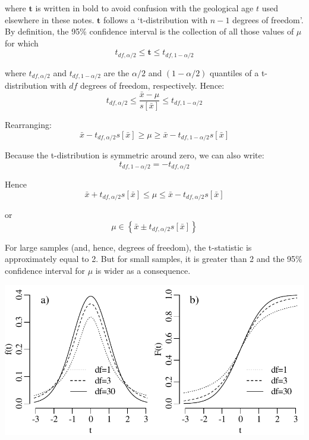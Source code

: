 \begin{refsection}
\noindent where $\mathbf{t}$ is written in bold to avoid confusion
with the geological age $t$ used elsewhere in these
notes. $\mathbf{t}$ follows a `t-distribution with $n-1$ degrees of
freedom'. By definition, the 95\% confidence interval is the
collection of all those values of $\mu$ for which
\[
t_{df,\alpha/2} \leq \mathbf{t} \leq t_{df,1-\alpha/2}
\]

\noindent where $t_{df,\alpha/2}$ and $t_{df,1-\alpha/2}$ are the
$\alpha/2$ and $(1-\alpha/2)$ quantiles of a t-distribution with $df$
degrees of freedom, respectively.  Hence:
\[
t_{df,\alpha/2} \leq \frac{\bar{x} - \mu}{s[\bar{x}]} \leq t_{df,1-\alpha/2}
\]

\noindent Rearranging:
\[
\bar{x} - t_{df,\alpha/2}s[\bar{x}] \geq \mu \geq
\bar{x} - t_{df,1-\alpha/2}s[\bar{x}]
\]

\noindent Because the t-distribution is symmetric around zero, we can also write:
\[
t_{df,1-\alpha/2} = -t_{df,\alpha/2}
\]

\noindent Hence
\[
\bar{x} + t_{df,\alpha/2}s[\bar{x}] \leq \mu \leq \bar{x} - t_{df,\alpha/2}s[\bar{x}]
\]

\noindent or
\begin{equation}
  \mu \in \left\{\bar{x} \pm t_{df,\alpha/2}s[\bar{x}]\right\}
  \label{eq:tci}
\end{equation}

For large samples (and, hence, degrees of freedom), the t-statistic is
approximately equal to 2. But for small samples, it is greater than 2
and the 95\% confidence interval for $\mu$ is wider as a consequence.

\noindent\begin{minipage}[t][][b]{.6\textwidth}
  \includegraphics[width=\textwidth]{../figures/tdof.pdf}\\
\end{minipage}
\begin{minipage}[t][][t]{.4\textwidth}
  \label{fig:tdof}
\end{minipage}


\end{refsection}
